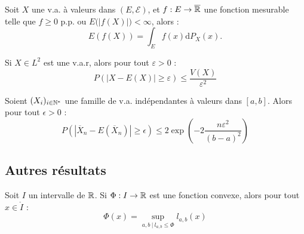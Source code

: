 \documentclass[11pt,a4paper]{article}
\begin{document}
\begin{propstar}
 Soit $X$ une v.a. à valeurs dans $(E,\mathcal{E})$, et $f :E\to \overline{\mathbb R}$ une fonction mesurable telle que $f\geq0$ p.p. ou $E\big( \left|f(X)\right| \big) <\infty$, alors :
\[E(f(X))=\int_E f(x)\mathrm{d}P_X(x).\]
\end{propstar}

\begin{corstar}
 Si $X\in L^2$ est une v.a.r, alors pour tout $\varepsilon >0$ :
\[P(|X-E(X)| \geq \varepsilon) \leq \frac{V(X)}{\varepsilon^2}\]
\end{corstar}

\begin{propstar}
Soient $(X_i)_{i\in \mathbb N^*}$ une famille de v.a. indépendantes à valeurs dans $[a,b]$. Alors pour tout $\epsilon > 0$ :
\[P( |\overline{X}_n - E(\overline{X}_n) | \geq \epsilon) \leq 2 \exp(-2\frac{n\varepsilon^2}{(b-a)^2})\]
\end{propstar}

\subsection*{Autres résultats}

\begin{lemmastar}
Soit $I$ un intervalle de $\mathbb R$. Si $ \Phi :I \to \mathbb R$ est une fonction convexe, alors pour tout $x\in \mathring{I}$ :
\[\Phi(x) = \sup_{a,b \ | \ l_{a,b} \leq \Phi } l_{a,b}(x)\]
\end{lemmastar}


\end{document}
